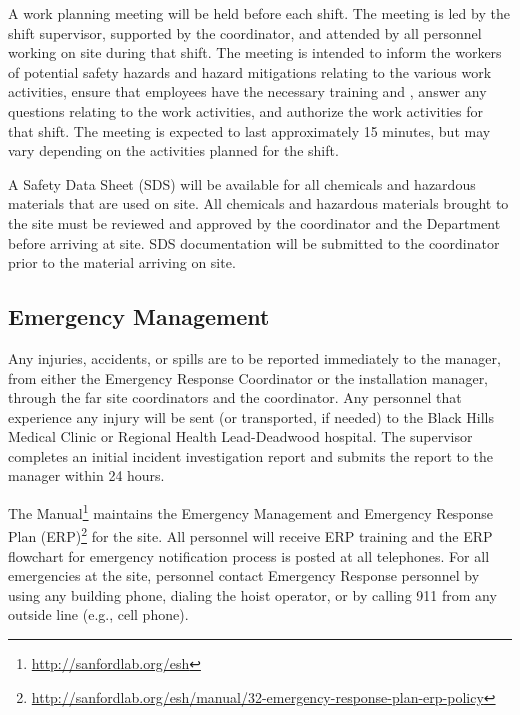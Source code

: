 A work planning meeting will be held %
before each shift. %
The meeting %
is led by the shift supervisor, supported by the   coordinator, and
attended by all personnel working on site during that shift. The meeting is intended to inform the workers of potential safety hazards and
hazard mitigations relating to the various work activities, ensure
that employees have the necessary  training and , answer any
questions relating to the work activities, and authorize the work
activities for that shift. The meeting is expected to last approximately 15 minutes, but 
may vary depending on the activities planned for the shift. 

A Safety Data Sheet (SDS) will be available for all chemicals and
hazardous materials that are used on site. All chemicals and hazardous
materials brought to the  site must be reviewed and approved by the
  coordinator and the  
Department before arriving at site.  SDS documentation will be
submitted to the   coordinator prior to the
material arriving on site.

\subsection{Emergency Management}

Any injuries, accidents, or spills are to be reported immediately to the
  manager, from either the  Emergency
Response Coordinator or the installation manager, through the  far site
 coordinators and the   coordinator. %
Any personnel that
experience any injury will be sent (or transported, if needed) to the Black Hills
Medical Clinic or Regional Health Lead-Deadwood hospital. %
The supervisor  completes an initial incident
investigation report and submits the report to the 
 manager within 24 hours.


The  
Manual\footnote{\url{http://sanfordlab.org/esh}} maintains the Emergency
Management and Emergency Response Plan 
(ERP)\footnote{\url{http://sanfordlab.org/esh/manual/32-emergency-response-plan-erp-policy}}
for the site. All personnel will receive ERP training and the ERP
flowchart for emergency notification process is posted at all
telephones. For all emergencies at the  site, personnel
contact Emergency Response personnel by using any building
phone, dialing the hoist operator, or by calling 911 from any outside
line (e.g., cell phone).

